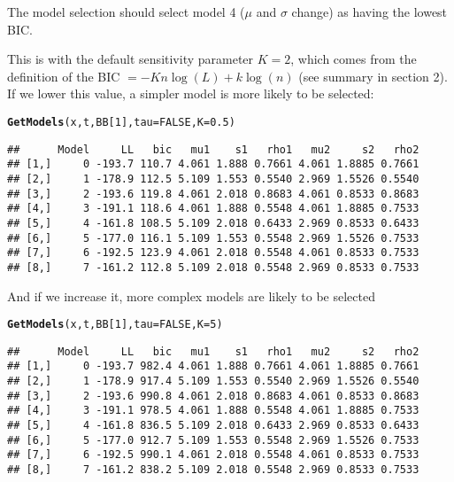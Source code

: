 \documentclass[10pt]{article}\usepackage[]{graphicx}\usepackage[]{color}
\makeatletter
\newcommand{\hlnum}[1]{\textcolor[rgb]{0.686,0.059,0.569}{#1}}%
\newcommand{\hlstd}[1]{\textcolor[rgb]{0.345,0.345,0.345}{#1}}%
\newcommand{\hlkwc}[1]{\textcolor[rgb]{0.333,0.667,0.333}{#1}}%
\newcommand{\hlkwd}[1]{\textcolor[rgb]{0.737,0.353,0.396}{\textbf{#1}}}%
\newenvironment{kframe}{%
 \def\at@end@of@kframe{}%
 \ifinner\ifhmode%
  \def\at@end@of@kframe{\end{minipage}}%
  \begin{minipage}{\columnwidth}%
 \fi\fi%
 \def\FrameCommand##1{\hskip\@totalleftmargin \hskip-\fboxsep
 \colorbox{shadecolor}{##1}\hskip-\fboxsep
     \hskip-\linewidth \hskip-\@totalleftmargin \hskip\columnwidth}%
 \MakeFramed {\advance\hsize-\width
   \@totalleftmargin\z@ \linewidth\hsize
   \@setminipage}}%
 {\par\unskip\endMakeFramed%
 \at@end@of@kframe}
\newenvironment{knitrout}{}{} %
\makeatother
\begin{document}
The model selection should select model 4 ($\mu$ and $\sigma$ change) as having the lowest BIC.  

This is with the default sensitivity parameter $K=2$, which comes from the definition of the BIC $= -Kn \log(L) + k \log(n)$ (see summary in section 2).  If we lower this value, a simpler model is more likely to be selected:
\begin{knitrout}
\color{fgcolor}\begin{kframe}
\begin{alltt}
\hlkwd{GetModels}\hlstd{(x, t, BB[}\hlnum{1}\hlstd{],} \hlkwc{tau} \hlstd{=} \hlnum{FALSE}\hlstd{,} \hlkwc{K} \hlstd{=} \hlnum{0.5}\hlstd{)}
\end{alltt}
\begin{verbatim}
##      Model     LL   bic   mu1    s1   rho1   mu2     s2   rho2
## [1,]     0 -193.7 110.7 4.061 1.888 0.7661 4.061 1.8885 0.7661
## [2,]     1 -178.9 112.5 5.109 1.553 0.5540 2.969 1.5526 0.5540
## [3,]     2 -193.6 119.8 4.061 2.018 0.8683 4.061 0.8533 0.8683
## [4,]     3 -191.1 118.6 4.061 1.888 0.5548 4.061 1.8885 0.7533
## [5,]     4 -161.8 108.5 5.109 2.018 0.6433 2.969 0.8533 0.6433
## [6,]     5 -177.0 116.1 5.109 1.553 0.5548 2.969 1.5526 0.7533
## [7,]     6 -192.5 123.9 4.061 2.018 0.5548 4.061 0.8533 0.7533
## [8,]     7 -161.2 112.8 5.109 2.018 0.5548 2.969 0.8533 0.7533
\end{verbatim}
\end{kframe}
\end{knitrout}


And if we increase it, more complex models are likely to be selected
\begin{knitrout}
\color{fgcolor}\begin{kframe}
\begin{alltt}
\hlkwd{GetModels}\hlstd{(x, t, BB[}\hlnum{1}\hlstd{],} \hlkwc{tau} \hlstd{=} \hlnum{FALSE}\hlstd{,} \hlkwc{K} \hlstd{=} \hlnum{5}\hlstd{)}
\end{alltt}
\begin{verbatim}
##      Model     LL   bic   mu1    s1   rho1   mu2     s2   rho2
## [1,]     0 -193.7 982.4 4.061 1.888 0.7661 4.061 1.8885 0.7661
## [2,]     1 -178.9 917.4 5.109 1.553 0.5540 2.969 1.5526 0.5540
## [3,]     2 -193.6 990.8 4.061 2.018 0.8683 4.061 0.8533 0.8683
## [4,]     3 -191.1 978.5 4.061 1.888 0.5548 4.061 1.8885 0.7533
## [5,]     4 -161.8 836.5 5.109 2.018 0.6433 2.969 0.8533 0.6433
## [6,]     5 -177.0 912.7 5.109 1.553 0.5548 2.969 1.5526 0.7533
## [7,]     6 -192.5 990.1 4.061 2.018 0.5548 4.061 0.8533 0.7533
## [8,]     7 -161.2 838.2 5.109 2.018 0.5548 2.969 0.8533 0.7533
\end{verbatim}
\end{kframe}
\end{knitrout}
\end{document}
